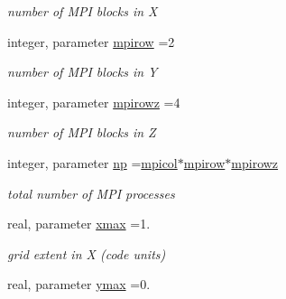 \begin{DoxyCompactItemize}
\begin{DoxyCompactList}\small\item\em number of M\+P\+I blocks in X \end{DoxyCompactList}\item 
\hypertarget{namespaceparameters_a15b7777c042a615b8c2d18578682e177}{}integer, parameter \hyperlink{namespaceparameters_a15b7777c042a615b8c2d18578682e177}{mpirow} =2\label{namespaceparameters_a15b7777c042a615b8c2d18578682e177}

\begin{DoxyCompactList}\small\item\em number of M\+P\+I blocks in Y \end{DoxyCompactList}\item 
\hypertarget{namespaceparameters_aeb329f6b921d76584073753e2596e410}{}integer, parameter \hyperlink{namespaceparameters_aeb329f6b921d76584073753e2596e410}{mpirowz} =4\label{namespaceparameters_aeb329f6b921d76584073753e2596e410}

\begin{DoxyCompactList}\small\item\em number of M\+P\+I blocks in Z \end{DoxyCompactList}\item 
\hypertarget{namespaceparameters_af4a703fa8afb09b800dbca84a465ed73}{}integer, parameter \hyperlink{namespaceparameters_af4a703fa8afb09b800dbca84a465ed73}{np} =\hyperlink{namespaceparameters_a5cf63ae056650e314df11497f8b13e28}{mpicol}$\ast$\hyperlink{namespaceparameters_a15b7777c042a615b8c2d18578682e177}{mpirow}$\ast$\hyperlink{namespaceparameters_aeb329f6b921d76584073753e2596e410}{mpirowz}\label{namespaceparameters_af4a703fa8afb09b800dbca84a465ed73}

\begin{DoxyCompactList}\small\item\em total number of M\+P\+I processes \end{DoxyCompactList}\item 
\hypertarget{namespaceparameters_a52f0c9493ee24c99cb8fad63d3ecddc8}{}real, parameter \hyperlink{namespaceparameters_a52f0c9493ee24c99cb8fad63d3ecddc8}{xmax} =1.\label{namespaceparameters_a52f0c9493ee24c99cb8fad63d3ecddc8}

\begin{DoxyCompactList}\small\item\em grid extent in X (code units) \end{DoxyCompactList}\item 
\hypertarget{namespaceparameters_af38b91fa583e6da2e09cac965ad56fcf}{}real, parameter \hyperlink{namespaceparameters_af38b91fa583e6da2e09cac965ad56fcf}{ymax} =0.\label{namespaceparameters_af38b91fa583e6da2e09cac965ad56fcf}


\end{DoxyCompactItemize}
